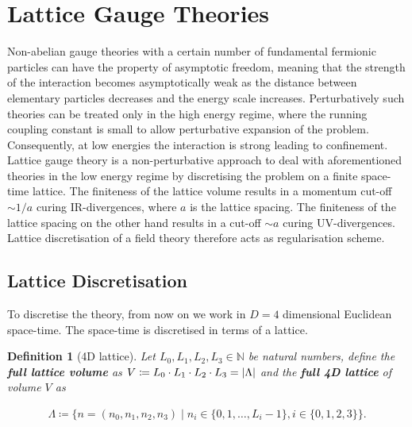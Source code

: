 \documentclass{article}
\theoremstyle{plain} %
\newtheorem{definition}{Definition}[section]
\theoremstyle{convention} %
\theoremstyle{remark} %
\def\df#1{\textbf{\textit{#1}}}
\numberwithin{equation}{section}
\begin{document}
\section{Lattice Gauge Theories}

\label{sec:lattice_gauge_theories}

Non-abelian gauge theories with a certain number of fundamental fermionic particles can have the property of asymptotic freedom, meaning that the strength of the interaction becomes asymptotically weak as the distance between elementary particles decreases and the energy scale increases. Perturbatively such theories can be treated only in the high energy regime, where the running coupling constant is small to allow perturbative expansion of the problem. Consequently, at low energies the interaction is strong leading to confinement. Lattice gauge theory is a non-perturbative approach to deal with aforementioned theories in the low energy regime by discretising the problem on a finite space-time lattice. The finiteness of the lattice volume results in a momentum cut-off $\sim 1/a$ curing IR-divergences, where $a$ is the lattice spacing. The finiteness of the lattice spacing on the other hand results in a cut-off $\sim a$ curing UV-divergences. Lattice discretisation of a field theory therefore acts as regularisation scheme.

\subsection{Lattice Discretisation}

To discretise the theory, from now on we work in $D=4$ dimensional Euclidean space-time. The space-time is discretised in terms of a lattice.

\begin{definition}[4D lattice]

Let $L_0, L_1, L_2, L_3 \in \mathbb{N}$ be natural numbers, define the \df{full lattice volume} as $V \coloneqq L_0 \cdot L_1 \cdot L_2 \cdot L_3 = \abs{\Lambda}$ and the \df{full 4D lattice} of volume $V$ as

\begin{align*}
    \Lambda \coloneqq \{ n = (n_0, n_1, n_2, n_3) \mid n_i \in \{0, 1, \dots, L_i - 1 \}, i \in \{0,1,2,3\} \}.
\end{align*}

\end{definition}
\end{document}

